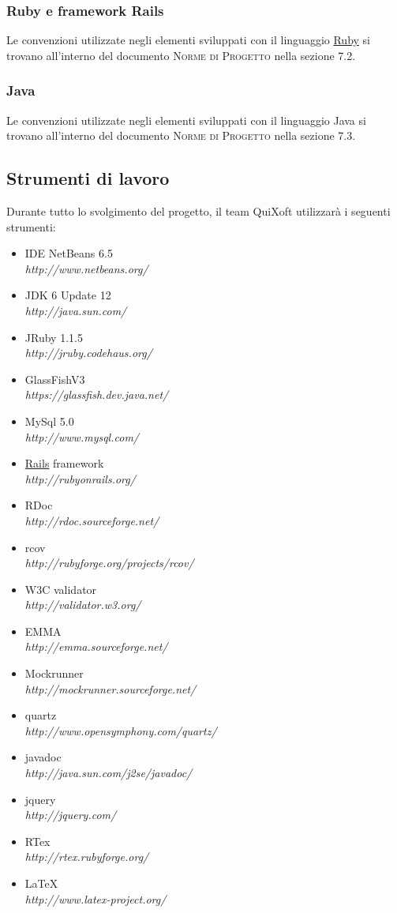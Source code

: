 \documentclass[11pt,a4paper]{article}
\begin{document}
\subsubsection{Ruby e framework Rails}
Le convenzioni utilizzate negli elementi sviluppati con il linguaggio \underline{Ruby} si trovano all'interno del documento \textsc{Norme di Progetto} nella sezione 7.2.
\subsubsection{Java}
Le convenzioni utilizzate negli elementi sviluppati con il linguaggio Java si trovano all'interno del documento \textsc{Norme di Progetto} nella sezione 7.3.

\subsection{Strumenti di lavoro}
Durante tutto lo svolgimento del progetto, il team QuiXoft utilizzarà i seguenti strumenti:
\begin{itemize}
 \item IDE NetBeans 6.5 \\ \textit{http://www.netbeans.org/}
 \item JDK 6 Update 12 \\ \textit{http://java.sun.com/}
 \item JRuby 1.1.5 \\ \textit{http://jruby.codehaus.org/}
 \item GlassFishV3 \\ \textit{https://glassfish.dev.java.net/}
 \item MySql 5.0 \\ \textit{http://www.mysql.com/}
 \item \underline{Rails} framework \\ \textit{http://rubyonrails.org/}
 \item RDoc \\ \textit{http://rdoc.sourceforge.net/}
 \item rcov \\ \textit{http://rubyforge.org/projects/rcov/}
 \item W3C validator \\ \textit {http://validator.w3.org/}
 \item EMMA \\ \textit {http://emma.sourceforge.net/}
 \item Mockrunner \\ \textit{http://mockrunner.sourceforge.net/}
 \item quartz \\ \textit {http://www.opensymphony.com/quartz/}
 \item javadoc \\ \textit {http://java.sun.com/j2se/javadoc/}
 \item jquery \\ \textit {http://jquery.com/}
 \item RTex \\ \textit {http://rtex.rubyforge.org/}
 \item \LaTeX \\ \textit {http://www.latex-project.org/}
\end{itemize}
\end{document}
